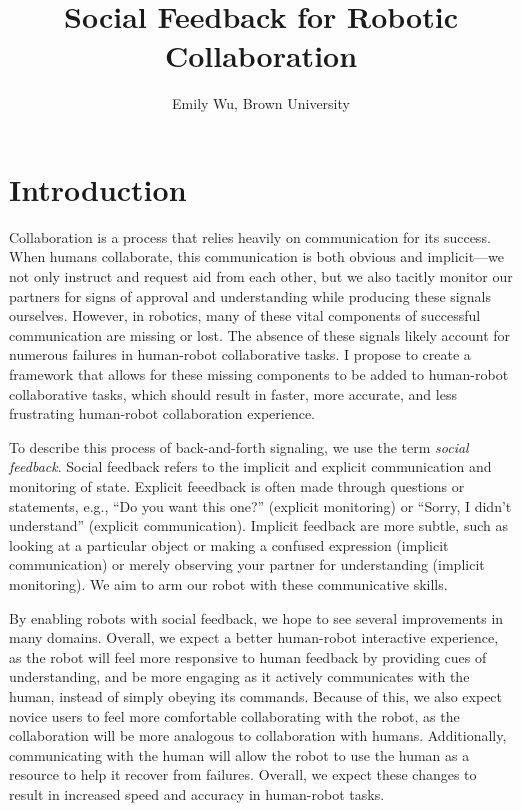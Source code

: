 \documentclass{article}
\title{Social Feedback for Robotic Collaboration}
\author{Emily Wu, Brown University}
\begin{document}
\maketitle

\section{Introduction}

Collaboration is a process that relies heavily on communication for its success. When humans collaborate, this communication is both obvious and implicit---we not only instruct and request aid from each other, but we also tacitly monitor our partners for signs of approval and understanding while producing these signals ourselves. However, in robotics, many of these vital components of successful communication are missing or lost. The absence of these signals likely account for numerous failures in human-robot collaborative tasks. I propose to create a framework that allows for these missing components to be added to human-robot collaborative tasks, which should result in faster, more accurate, and less frustrating human-robot collaboration experience. 

To describe this process of back-and-forth signaling, we use the term \emph{social feedback}. Social feedback refers to the implicit and explicit communication and monitoring of state. Explicit feeedback is often made through questions or statements, e.g., ``Do you want this one?'' (explicit monitoring) or ``Sorry, I didn't understand'' (explicit communication). Implicit feedback are more subtle, such as looking at a particular object or making a confused expression (implicit communication) or merely observing your partner for understanding (implicit monitoring). We aim to arm our robot with these communicative skills. 

By enabling robots with social feedback, we hope to see several improvements in many domains. Overall, we expect a better human-robot interactive experience, as the robot will feel more responsive to human feedback by providing cues of understanding, and be more engaging as it actively communicates with the human, instead of simply obeying its commands. Because of this, we also expect novice users to feel more comfortable collaborating with the robot, as the collaboration will be more analogous to collaboration with humans. Additionally, communicating with the human will allow the robot to use the human as a resource to help it recover from failures. Overall, we expect these changes to result in increased speed and accuracy in human-robot tasks. 
\end{document}
